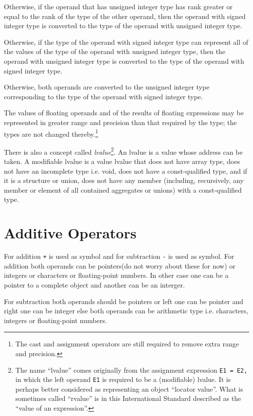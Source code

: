 \noindent Otherwise, if the operand that has unsigned integer type has rank greater or
equal to the rank of the type of the other operand, then the operand with
signed integer type is converted to the type of the operand with unsigned
integer type.


\noindent Otherwise, if the type of the operand with signed integer type can represent
all of the values of the type of the operand with unsigned integer type, then
the operand with unsigned integer type is converted to the type of the
operand with signed integer type.


\noindent Otherwise, both operands are converted to the unsigned integer type
corresponding to the type of the operand with signed integer type.


\setlength{\leftskip}{0cm}
The values of floating operands and of the results of floating expressions may
be represented in greater range and precision than that required by the type;
the types are not changed thereby.\footnote{The cast and assignment operators
  are still required to remove extra range and precision.}

There is also a concept called \textit{lvalue}\footnote{The name ``lvalue''
  comes originally from the assignment expression \texttt{E1 = E2,} in which
  the left operand \texttt{E1} is required to be a (modifiable) lvalue. It is
  perhaps better considered as representing an object ``locator value''. What
  is sometimes called ``rvalue'' is in this International Standard described 
  as the ``value of an expression''.}. An lvalue is a value whose
address can be taken. A modifiable lvalue is a value lvalue that does not have
array type, does not have an incomplete type i.e. void, does not have a
const-qualified type, and if it is a structure or union, does not have any
member (including, recursively, any member or element of all contained
aggregates or unions) with a const-qualified type.

\section{Additive Operators}
For addition \texttt{+} is used as symbol and for subtraction \texttt{-} is
used as symbol. For addition both operands can be pointers(do not worry about
these for now) or integers or characters or floating-point numbers. In other
case one can be a pointer to a complete object and another can be an interger.

For subtraction both operands should be pointers or left one can be pointer and
right one can be integer else both operands can be arithmetic type
i.e. characters, integers or floating-point numbers.

